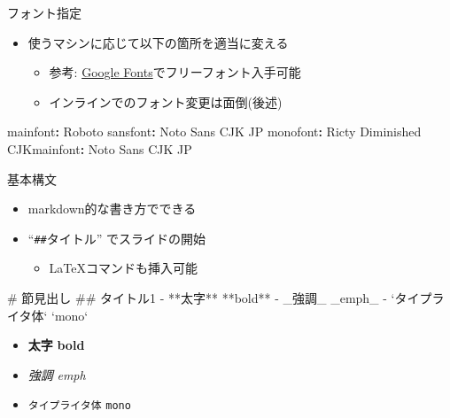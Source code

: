 \documentclass[
  12pt,
  ignorenonframetext,
]{beamer}
\newenvironment{Shaded}{\begin{snugshade}}{\end{snugshade}}
\newcommand{\AttributeTok}[1]{\textcolor[rgb]{0.77,0.63,0.00}{#1}}
\newcommand{\BaseNTok}[1]{\textcolor[rgb]{0.00,0.00,0.81}{#1}}
\newcommand{\FunctionTok}[1]{\textcolor[rgb]{0.00,0.00,0.00}{#1}}
\newcommand{\KeywordTok}[1]{\textcolor[rgb]{0.13,0.29,0.53}{\textbf{#1}}}
\newcommand{\NormalTok}[1]{#1}
\newcommand{\StringTok}[1]{\textcolor[rgb]{0.31,0.60,0.02}{#1}}
\providecommand{\tightlist}{%
  \setlength{\itemsep}{0pt}\setlength{\parskip}{0pt}}
\begin{document}
\begin{frame}[fragile]{フォント指定}
\protect\hypertarget{ux30d5ux30a9ux30f3ux30c8ux6307ux5b9a}{}

\begin{itemize}
\tightlist
\item
  使うマシンに応じて以下の箇所を適当に変える

  \begin{itemize}
  \tightlist
  \item
    参考:
    \href{https://fonts.google.com/?category=Sans+Serif\#standard-styles}{Google
    Fonts}でフリーフォント入手可能
  \item
    インラインでのフォント変更は面倒(後述)
  \end{itemize}
\end{itemize}

\begin{Shaded}
\begin{Highlighting}[]
\FunctionTok{mainfont}\KeywordTok{:}\AttributeTok{ Roboto}
\FunctionTok{sansfont}\KeywordTok{:}\AttributeTok{ Noto Sans CJK JP}
\FunctionTok{monofont}\KeywordTok{:}\AttributeTok{ Ricty Diminished}
\FunctionTok{CJKmainfont}\KeywordTok{:}\AttributeTok{ Noto Sans CJK JP}
\end{Highlighting}
\end{Shaded}

\end{frame}

\begin{frame}[fragile]{基本構文}
\protect\hypertarget{ux57faux672cux69cbux6587}{}

\begin{itemize}
\tightlist
\item
  markdown的な書き方でできる
\item
  ``\texttt{\#\#}タイトル'' でスライドの開始

  \begin{itemize}
  \tightlist
  \item
    \LaTeX コマンドも挿入可能
  \end{itemize}
\end{itemize}

\begin{Shaded}
\begin{Highlighting}[]
\FunctionTok{# 節見出し}
\FunctionTok{## タイトル1}
\NormalTok{- **太字** **bold**}
\NormalTok{- }\StringTok{_強調_ _emph_}
\StringTok{- }\BaseNTok{`タイプライタ体`}\StringTok{ }\BaseNTok{`mono`}
\end{Highlighting}
\end{Shaded}

\begin{itemize}
\tightlist
\item
  \textbf{太字} \textbf{bold}
\item
  \emph{強調} \emph{emph}
\item
  \texttt{タイプライタ体} \texttt{mono}
\end{itemize}

\end{frame}
\end{document}
